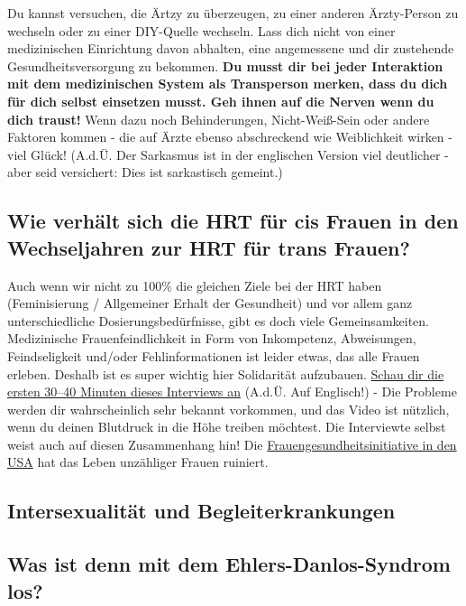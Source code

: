 \documentclass{article}
\begin{document}
Du kannst versuchen, die Ärtzy zu überzeugen, zu einer anderen Ärzty-Person zu wechseln oder zu einer DIY-Quelle wechseln. Lass dich nicht von einer medizinischen Einrichtung davon abhalten, eine angemessene und dir zustehende Gesundheitsversorgung zu bekommen. \textbf{Du musst dir bei jeder Interaktion mit dem medizinischen System als Transperson merken, dass du dich für dich selbst einsetzen musst. Geh ihnen auf die Nerven wenn du dich traust! } Wenn dazu noch Behinderungen, Nicht-Weiß-Sein oder andere Faktoren kommen - die auf Ärzte ebenso abschreckend wie Weiblichkeit wirken - viel Glück! (A.d.Ü. Der Sarkasmus ist in der englischen Version viel deutlicher - aber seid versichert: Dies ist sarkastisch gemeint.)

\subsection{Wie verhält sich die HRT für cis Frauen in den Wechseljahren zur HRT für trans Frauen?}\label{11-29}

Auch wenn wir nicht zu 100\% die gleichen Ziele bei der HRT haben (Feminisierung / Allgemeiner Erhalt der Gesundheit) und vor allem ganz unterschiedliche Dosierungsbedürfnisse, gibt es doch viele Gemeinsamkeiten. Medizinische Frauenfeindlichkeit in Form von Inkompetenz, Abweisungen, Feindseligkeit und/oder Fehlinformationen ist leider etwas, das alle Frauen erleben. Deshalb ist es super wichtig hier Solidarität aufzubauen. \href{https://www.youtube.com/watch?v=W0XW6av2wLQ}{Schau dir die ersten 30–40 Minuten dieses Interviews an} (A.d.Ü. Auf Englisch!) - Die Probleme werden dir wahrscheinlich sehr bekannt vorkommen, und das Video ist nützlich, wenn du deinen Blutdruck in die Höhe treiben möchtest. Die Interviewte selbst weist auch auf diesen Zusammenhang hin! Die \href{https://de.wikipedia.org/wiki/Frauengesundheitsinitiative}{Frauengesundheitsinitiative in den USA} hat das Leben unzähliger Frauen ruiniert.

\subsection*{Intersexualität und Begleiterkrankungen}

\subsection{Was ist denn mit dem Ehlers-Danlos-Syndrom los?}
\end{document}
